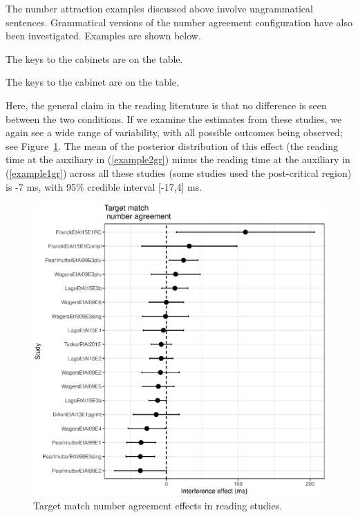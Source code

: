 \documentclass{cambridge7A}\usepackage[]{graphicx}\usepackage[]{color}
\makeatletter
\def\maxwidth{ %
  \ifdim\Gin@nat@width>\linewidth
    \linewidth
  \else
    \Gin@nat@width
  \fi
}
\newenvironment{knitrout}{}{} %
\makeatother
\begin{document}
The number attraction examples discussed above involve  ungrammatical sentences.
Grammatical versions of the number agreement configuration have also been investigated. Examples are shown below.

 \begin{exe} 
\ex
\begin{xlist}
\item \label{example1gr}
The keys to the cabinets are on the table.
\item \label{example2gr}
The keys to the cabinet are on the table.
\end{xlist}
\end{exe}



 Here, the general claim in the reading literature \citep{lago2015agreement} is that no difference is seen between the two conditions. If we examine the estimates from these studies, 
  we again see a wide range of variability, with all possible outcomes being observed; see Figure~\ref{fig:matchnumagrmt}. 
The mean of the posterior distribution of this effect
(the reading time at the auxiliary in (\ref{example2gr}) minus the reading time at the auxiliary in (\ref{example1gr})  across all these studies (some studies used the post-critical region) is   
-7 ms, with 95\% credible interval [-17,4] ms.

\begin{figure}[!htbp]
\centering
\begin{knitrout}
\color{fgcolor}

{\centering \includegraphics[width=\maxwidth]{figures/fig-matchnumagrmtplot-1} 

}



\end{knitrout}
\caption{Target match number agreement effects in reading studies.}\label{fig:matchnumagrmt}
\end{figure}
\end{document}
